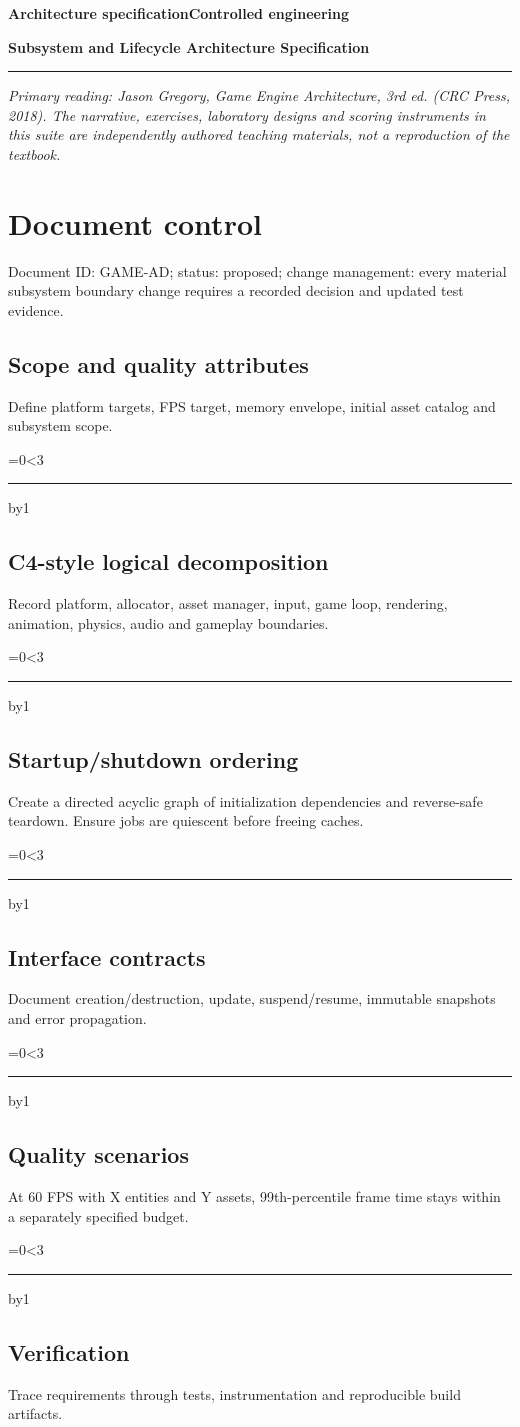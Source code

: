 \documentclass[11pt,letterpaper]{article}
\newcommand{\DocType}{Reference}
\newcommand{\SuiteHeading}[3]{%
\renewcommand{\DocType}{#2}%
{\small\bfseries\sffamily\color{EngineTeal}#2\hfill #3}\par\vspace{6pt}
{\LARGE\bfseries\color{EngineBlue}#1}\par\vspace{4pt}
{\color{EngineTeal}\rule{\linewidth}{1pt}}\par\vspace{7pt}}
\newcommand{\WriteLines}[1]{\par\begingroup\setlength{\parskip}{9pt}\count255=0\loop\ifnum\count255<#1\noindent\rule{\linewidth}{0.35pt}\par\advance\count255 by1\repeat\endgroup\smallskip}
\newcommand{\SourceNote}{\footnotesize\textit{Primary reading: Jason Gregory, \emph{Game Engine Architecture}, 3rd ed. (CRC Press, 2018). The narrative, exercises, laboratory designs and scoring instruments in this suite are independently authored teaching materials, not a reproduction of the textbook.}\normalsize\par}
\begin{document}
\SuiteHeading{Subsystem and Lifecycle Architecture Specification}{Architecture specification}{Controlled engineering}
\SourceNote
\section{Document control}
Document ID: GAME-AD; status: proposed; change management: every material subsystem boundary change requires a recorded decision and updated test evidence.

\subsection{Scope and quality attributes}
Define platform targets, FPS target, memory envelope, initial asset catalog and subsystem scope.

\WriteLines{3}
\subsection{C4-style logical decomposition}
Record platform, allocator, asset manager, input, game loop, rendering, animation, physics, audio and gameplay boundaries.

\WriteLines{3}
\subsection{Startup/shutdown ordering}
Create a directed acyclic graph of initialization dependencies and reverse-safe teardown. Ensure jobs are quiescent before freeing caches.

\WriteLines{3}
\subsection{Interface contracts}
Document creation/destruction, update, suspend/resume, immutable snapshots and error propagation.

\WriteLines{3}
\subsection{Quality scenarios}
At 60 FPS with X entities and Y assets, 99th-percentile frame time stays within a separately specified budget.

\WriteLines{3}
\subsection{Verification}
Trace requirements through tests, instrumentation and reproducible build artifacts.
\end{document}
